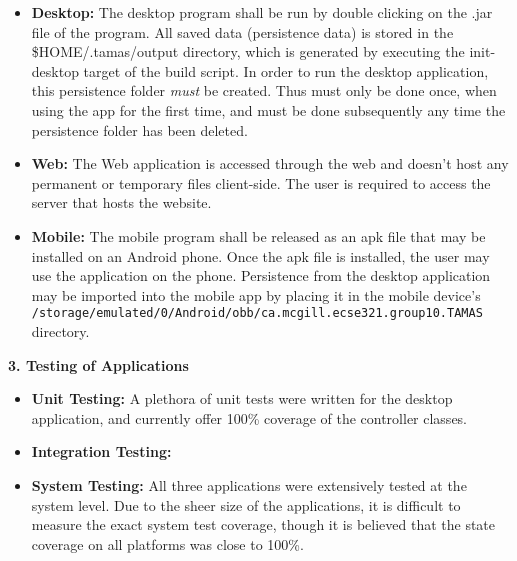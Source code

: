\documentclass[12pt]{article}
\begin{document}
\begin{itemize}
	\item \textbf{Desktop:} The desktop program shall be run by double clicking on the .jar file of
		the program. All saved data (persistence data) is stored in the \$HOME/.tamas/output
		directory, which is generated by executing the init-desktop target of the build script. In
		order to run the desktop application, this persistence folder \textit{must} be created. Thus
		must only be done once, when using the app for the first time, and must be done subsequently
		any time the persistence folder has been deleted.
	\item \textbf{Web:} The Web application is accessed through the web and doesn't host any permanent or temporary files client-side. The user is required to access the server that hosts the website.
	
	\item \textbf{Mobile:} The mobile program shall be released as an apk file that may be installed
		on an Android phone. Once the apk file is installed, the user may use the application on the
		phone. Persistence from the desktop application may be imported into the mobile app by
		placing it in the mobile device's
		\texttt{/storage/emulated/0/Android/obb/ca.mcgill.ecse321.group10.TAMAS} directory.
\end{itemize}

\textbf{3. Testing of Applications}


\begin{itemize}
	\item \textbf{Unit Testing:} A plethora of unit tests were written for the desktop application,
		and currently offer 100\% coverage of the controller classes.
	\item \textbf{Integration Testing:}
	\item \textbf{System Testing:} All three applications were extensively tested at the system
		level. Due to the sheer size of the applications, it is difficult to measure the exact
		system test coverage, though it is believed that the state coverage on all platforms was
		close to 100\%.
\end{itemize}
\end{document}
